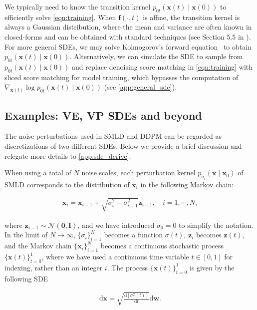 We typically need to know the transition kernel $p_{0t}(\mathbf{x}(t) \mid \mathbf{x}(0))$ to efficiently solve \ref{eqn:training}. When $\mathbf{f}(\cdot, t)$ is affine, the transition kernel is always a Gaussian distribution, where the mean and variance are often known in closed-forms and can be obtained with standard techniques (see Section 5.5 in \citet{sarkka2019applied}). For more general SDEs, we may solve Kolmogorov's forward equation~\citep{oksendal2003stochastic} to obtain $p_{0t}(\mathbf{x}(t) \mid \mathbf{x}(0))$. Alternatively, we can simulate the SDE to sample from $p_{0t}(\mathbf{x}(t) \mid \mathbf{x}(0))$ and replace denoising score matching in \ref{eqn:training} with sliced score matching for model training, which bypasses the computation of $\nabla_{\mathbf{x}(t)} \log p_{0t}(\mathbf{x}(t) \mid \mathbf{x}(0))$ (see \ref{app:general_sde}).

\subsection{Examples: VE, VP SDEs and beyond}\label{sec:sde_examples}
The noise perturbations used in SMLD and DDPM can be regarded as discretizations of two different SDEs. Below we provide a brief discussion and relegate more details to \ref{app:sde_derive}.

When using a total of $N$ noise scales, each perturbation kernel $p_{\sigma_i}(\mathbf{x} \mid \mathbf{x}_0)$ of SMLD corresponds to the distribution of $\mathbf{x}_i$ in the following Markov chain:

\begin{align}
\mathbf{x}_i = \mathbf{x}_{i-1} + \sqrt{\sigma_{i}^2 - \sigma_{i-1}^2} \mathbf{z}_{i-1}, \quad i=1,\cdots,N \label{eqn:ncsn},
\end{align}

where $\mathbf{z}_{i-1} \sim \mathcal{N}(\mathbf{0}, \mathbf{I})$, and we have introduced $\sigma_0 = 0$ to simplify the notation. In the limit of $N \to \infty$, $\{\sigma_i\}_{i=1}^N$ becomes a function $\sigma(t)$, $\mathbf{z}_i$ becomes $\mathbf{z}(t)$, and the Markov chain $\{\mathbf{x}_i\}_{i=1}^N$ becomes a continuous stochastic process $\{\mathbf{x}(t)\}_{t=0}^1$, where we have used a continuous time variable $t \in [0, 1]$ for indexing, rather than an integer $i$. The process $\{\mathbf{x}(t)\}_{t=0}^1$ is given by the following SDE

\begin{align}
\mathrm{d} \mathbf{x} = \sqrt{\frac{\mathrm{d} \left[ \sigma^2(t) \right]}{\mathrm{d} t}}\mathrm{d} \mathbf{w}. \label{eqn:ncsn_sde}
\end{align}

